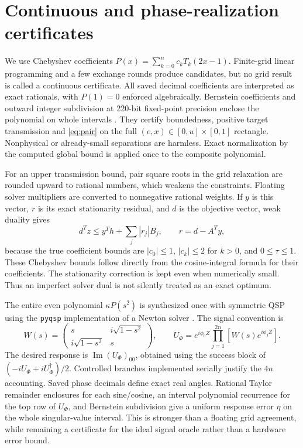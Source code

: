 \documentclass[11pt]{article}
\begin{document}
\section{Continuous and phase-realization certificates}\label{sec:cert}
We use Chebyshev coefficients $P(x)=\sum_{k=0}^n c_kT_k(2x-1)$.
Finite-grid linear programming and a few exchange rounds produce
candidates, but no grid result is called a continuous certificate.
All saved decimal coefficients are interpreted as exact rationals, with
$P(1)=0$ enforced algebraically. Bernstein coefficients and outward
integer subdivision at 220-bit fixed-point precision enclose the
polynomial on whole intervals \cite{Farouki}. They certify boundedness,
positive target transmission and \eqref{eq:pair} on the full
$(e,x)\in[0,u]\times[0,1]$ rectangle. Nonphysical or already-small
separations are harmless. Exact normalization by the computed global
bound is applied once to the composite polynomial.

For an upper transmission bound, pair square roots in the grid relaxation
are rounded upward to rational numbers, which weakens the constraints.
Floating solver multipliers are converted to nonnegative rational
weights. If $y$ is this vector, $r$ is its exact stationarity residual,
and $d$ is the objective vector, weak duality gives
\begin{equation}\label{eq:dual}
 d^Tz\leq y^T h+\sum_j |r_j|B_j,\qquad r=d-A^Ty,
\end{equation}
because the true coefficient bounds are $|c_0|\leq1$, $|c_k|\leq2$
for $k>0$, and $0\leq\tau\leq1$. These Chebyshev bounds follow directly
from the cosine-integral formula for their coefficients. The stationarity
correction is kept even when numerically small. Thus an imperfect solver
dual is not silently treated as an exact optimum.

The entire even polynomial $\kappa P(s^2)$ is synthesized once with
symmetric QSP using the \texttt{pyqsp} implementation of a Newton solver
\cite{Symmetric}. The signal convention is
\[
 W(s)=\begin{pmatrix}s&i\sqrt{1-s^2}\\i\sqrt{1-s^2}&s\end{pmatrix},\qquad
 U_\Phi=e^{i\phi_0Z}\prod_{j=1}^{2n}[W(s)e^{i\phi_jZ}].
\]
The desired response is $\operatorname{Im}(U_\Phi)_{00}$, obtained using
the success block of $(-iU_\Phi+iU_\Phi^\dagger)/2$. Controlled branches
implemented serially justify the $4n$ accounting. Saved phase decimals
define exact real angles. Rational Taylor remainder enclosures for each
sine/cosine, an interval polynomial recurrence for the top row of
$U_\Phi$, and Bernstein subdivision give a uniform response error
$\eta$ on the whole singular-value interval. This is stronger than a
floating grid agreement, while remaining a certificate for the ideal
signal oracle rather than a hardware error bound.
\end{document}
